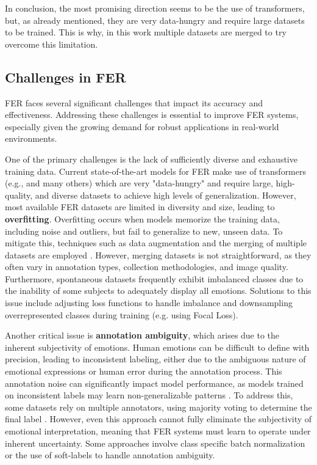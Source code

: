 In conclusion, the most promising direction seems to be the use of transformers, but, as already mentioned, they are very data-hungry and require large datasets to be trained. This is why, in this work multiple datasets are merged to try overcome this limitation.

\subsection{Challenges in FER}
FER faces several significant challenges that impact its accuracy and effectiveness. Addressing these challenges is essential to improve FER systems, especially given the growing demand for robust applications in real-world environments.

One of the primary challenges is the lack of sufficiently diverse and exhaustive training data. Current state-of-the-art models for FER make use of transformers (e.g., \cite{RW_1_POSTERV2}\cite{RW_6_VTFF}\cite{RW_4_TRANSFER} and many others) which are very "data-hungry" and require large, high-quality, and diverse datasets to achieve high levels of generalization. However, most available FER datasets are limited in diversity and size, leading to \textbf{overfitting}. Overfitting occurs when models memorize the training data, including noise and outliers, but fail to generalize to new, unseen data. To mitigate this, techniques such as data augmentation and the merging of multiple datasets are employed \cite{RW_12A_FMAE}. However, merging datasets is not straightforward, as they often vary in annotation types, collection methodologies, and image quality. Furthermore, spontaneous datasets frequently exhibit imbalanced classes due to the inability of some subjects to adequately display all emotions. Solutions to this issue include adjusting loss functions to handle imbalance and downsampling overrepresented classes during training (e.g. \cite{RW_8B_CMANET} using Focal Loss).

Another critical issue is \textbf{annotation ambiguity}, which arises due to the inherent subjectivity of emotions. Human emotions can be difficult to define with precision, leading to inconsistent labeling, either due to the ambiguous nature of emotional expressions or human error during the annotation process. This annotation noise can significantly impact model performance, as models trained on inconsistent labels may learn non-generalizable patterns . To address this, some datasets rely on multiple annotators, using majority voting to determine the final label \cite{AffectNet} \cite{FER+}. However, even this approach cannot fully eliminate the subjectivity of emotional interpretation, meaning that FER systems must learn to operate under inherent uncertainty. Some approaches involve class specific batch normalization \cite{RW_4_TRANSFER} or the use of soft-labels \cite{RW_13_BTN} to handle annotation ambiguity.


